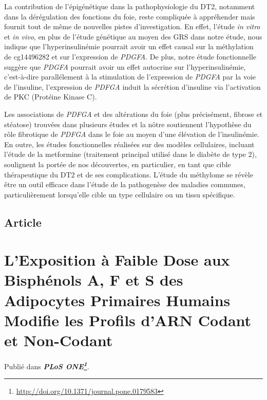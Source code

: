 \documentclass[11pt,a4paper,notrimn]{krantz}
\renewcommand{\href}[2]{#2\footnote{\url{#1}}}
\theoremstyle{definition}
\theoremstyle{definition}
\theoremstyle{remark}
\begin{document}
La contribution de l'épigénétique dans la pathophysiologie du DT2,
notamment dans la dérégulation des fonctions du foie, reste compliquée à
appréhender mais fournit tout de même de nouvelles pistes
d'investigation. En effet, l'étude \emph{in vitro} et \emph{in vivo}, en
plus de l'étude génétique au moyen des GRS dans notre étude, nous
indique que l'hyperinsulinémie pourrait avoir un effet causal sur la
méthylation de cg14496282 et sur l'expression de \emph{PDGFA}. De plus,
notre étude fonctionnelle suggère que \emph{PDGFA} pourrait avoir un
effet autocrine sur l'hyperinsulinémie, c'est-à-dire parallélement à la
stimulation de l'expression de \emph{PDGFA} par la voie de l'insuline,
l'expression de \emph{PDFGA} induit la sécrétion d'insuline via
l'activation de PKC (Protéine Kinase C).

Les associations de \emph{PDFGA} et des altérations du foie (plus
précisément, fibrose et stéatose) trouvées dans plusieurs études et la
nôtre soutiennent l'hypothèse du rôle fibrotique de \emph{PDFGA} dans le
foie au moyen d'une élévation de l'insulinémie. En outre, les études
fonctionnelles réalisées sur des modèles cellulaires, incluant l'étude
de la metformine (traitement principal utilisé dans le diabète de type
2), soulignent la portée de nos découvertes, en particulier, en tant que
cible thérapeutique du DT2 et de ses complications. L'étude du méthylome
se révèle être un outil efficace dans l'étude de la pathogenèse des
maladies communes, particulièrement lorsqu'elle cible un type cellulaire
ou un tissu spécifique.

\section{Article}\label{article-2}

\clearpage




\chapter{L'Exposition à Faible Dose aux Bisphénols A, F et S des
Adipocytes Primaires Humains Modifie les Profils d'ARN Codant et
Non-Codant}\label{Article4}

Publié dans
\textbf{\emph{\href{http://doi.org/10.1371/journal.pone.0179583}{PLoS ONE}}}.
\end{document}
